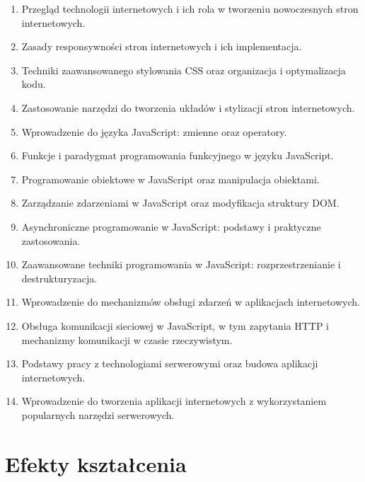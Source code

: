 \documentclass[12pt, a4paper]{article}
\begin{document}
\begin{enumerate}
  \item Przegląd technologii internetowych i ich rola w tworzeniu nowoczesnych stron internetowych.
  \item Zasady responsywności stron internetowych i ich implementacja.
  \item Techniki zaawansowanego stylowania CSS oraz organizacja i optymalizacja kodu.
  \item Zastosowanie narzędzi do tworzenia układów i stylizacji stron internetowych.
  \item Wprowadzenie do języka JavaScript: zmienne oraz operatory.
  \item Funkcje i paradygmat programowania funkcyjnego w języku JavaScript.
  \item Programowanie obiektowe w JavaScript oraz manipulacja obiektami.
  \item Zarządzanie zdarzeniami w JavaScript oraz modyfikacja struktury DOM.
  \item Asynchroniczne programowanie w JavaScript: podstawy i praktyczne zastosowania.
  \item Zaawansowane techniki programowania w JavaScript: rozprzestrzenianie i destrukturyzacja.
  \item Wprowadzenie do mechanizmów obsługi zdarzeń w aplikacjach internetowych.
  \item Obsługa komunikacji sieciowej w JavaScript, w tym zapytania HTTP i mechanizmy komunikacji w czasie rzeczywistym.
  \item Podstawy pracy z technologiami serwerowymi oraz budowa aplikacji internetowych.
  \item Wprowadzenie do tworzenia aplikacji internetowych z wykorzystaniem popularnych narzędzi serwerowych.
\end{enumerate}

\section{Efekty kształcenia}
\end{document}
